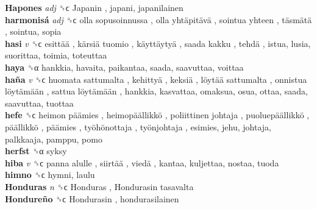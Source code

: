 \textbf{Hapones} \emph{adj}  ␝ϲ   Japanin , japani, japanilainen  \\
\textbf{harmonisá} \emph{adj}  ␝ϲ   olla sopusoinnussa ,  olla yhtäpitävä ,  sointua yhteen ,  täsmätä , sointua, sopia  \\
\textbf{hasi} \emph{v}  ␝ϲ   esittää ,  kärsiä tuomio ,  käyttäytyä ,  saada kakku ,  tehdä , istua, lusia, suorittaa, toimia, toteuttaa  \\
\textbf{haya} ␝α  hankkia, havaita, paikantaa, saada, saavuttaa, voittaa  \\
\textbf{haña} \emph{v}  ␝ϲ   huomata sattumalta ,  kehittyä ,  keksiä ,  löytää sattumalta ,  onnistua löytämään ,  sattua löytämään , hankkia, kasvattaa, omaksua, osua, ottaa, saada, saavuttaa, tuottaa  \\
\textbf{hefe} ␝ϲ   heimon päämies ,  heimopäällikkö ,  poliittinen johtaja ,  puoluepäällikkö ,  päällikkö ,  päämies ,  työhönottaja ,  työnjohtaja , esimies, jehu, johtaja, palkkaaja, pamppu, pomo  \\
\textbf{herfst} ␝α  syksy  \\
\textbf{hiba} \emph{v}  ␝ϲ   panna alulle ,  siirtää ,  viedä , kantaa, kuljettaa, nostaa, tuoda  \\
\textbf{himno} ␝ϲ  hymni, laulu  \\
\textbf{Honduras} \emph{n}  ␝ϲ   Honduras ,  Hondurasin tasavalta   \\
\textbf{Hondureño} ␝ϲ   Hondurasin , hondurasilainen  \\
